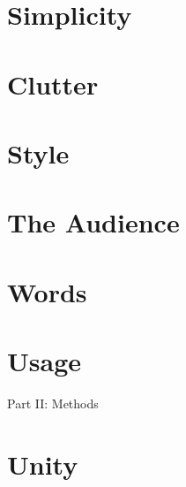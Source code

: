 \documentclass{article}
\begin{document}
\section{Simplicity}


\section{Clutter}


\section{Style}


\section{The Audience}


\section{Words}


\section{Usage}


\begin{center}\huge
	Part II: Methods
\end{center}


\section{Unity}

\end{document}
